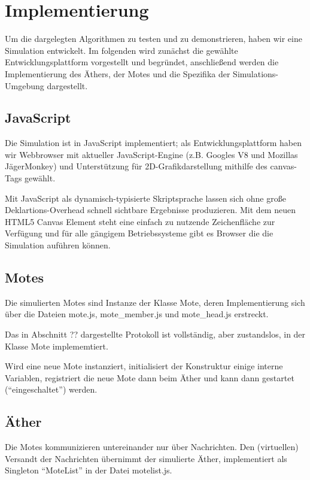\section{Implementierung}

Um die dargelegten Algorithmen zu testen und zu demonstrieren, haben wir
eine Simulation entwickelt. Im folgenden wird zunächst die gewählte
Entwicklungsplattform vorgestellt und begründet, anschließend werden die
Implementierung des Äthers, der Motes und die Spezifika der
Simulations-Umgebung dargestellt.

\subsection{JavaScript}

Die Simulation ist in JavaScript implementiert; als
Entwicklungsplattform haben wir Webbrowser mit aktueller
JavaScript-Engine (z.B. Googles V8 und Mozillas JägerMonkey) und
Unterstützung für 2D-Grafikdarstellung mithilfe des canvas-Tags gewählt.

Mit JavaScript als dynamisch-typisierte Skriptsprache lassen sich ohne
große Deklartions-Overhead schnell sichtbare Ergebnisse produzieren. Mit
dem neuen HTML5 Canvas Element steht eine einfach zu nutzende
Zeichenfläche zur Verfügung und für alle gängigem Betriebssysteme gibt
es Browser die die Simulation auführen können.

\subsection{Motes}

Die simulierten Motes sind Instanze der Klasse Mote, deren
Implementierung sich über die Dateien mote.js, mote\_member.js und
mote\_head.js erstreckt.

Das in Abschnitt ?? dargestellte Protokoll ist vollständig, aber
zustandslos, in der Klasse Mote implememtiert.

Wird eine neue Mote instanziert, initialisiert der Konstruktur einige
interne Variablen, registriert die neue Mote dann beim Äther und kann
dann gestartet (``eingeschaltet'') werden.

\subsection{Äther}

Die Motes kommunizieren untereinander nur über Nachrichten. Den
(virtuellen) Versandt der Nachrichten übernimmt der simulierte Äther,
implementiert als Singleton ``MoteList'' in der Datei motelist.js.

